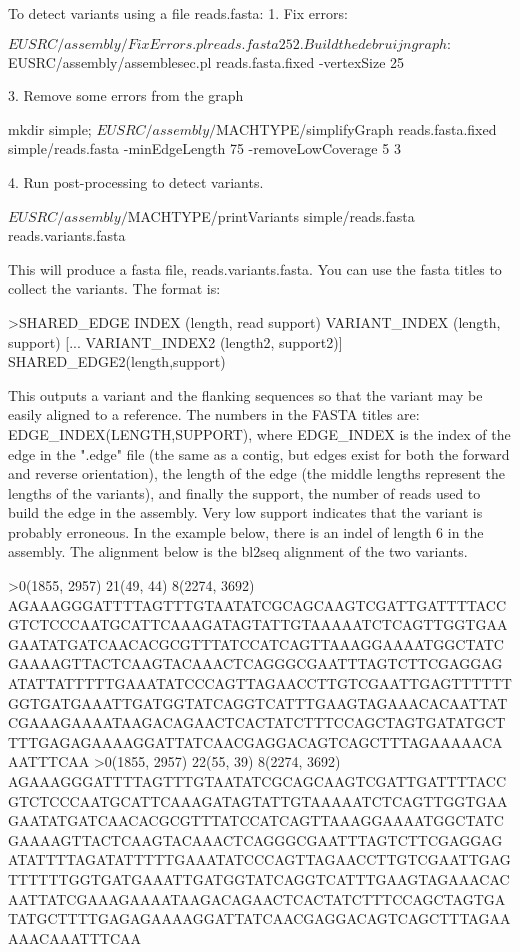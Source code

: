 \documentclass{article}[12pt]
\begin{document}
	To detect variants using a file reads.fasta:
	1. Fix errors:
	
	${EUSRC}/assembly/FixErrors.pl reads.fasta 25

	2. Build the de bruijn graph:
	
	${EUSRC}/assembly/assemblesec.pl reads.fasta.fixed -vertexSize 25
	
	3. Remove some errors from the graph

	mkdir simple;
	${EUSRC}/assembly/${MACHTYPE}/simplifyGraph reads.fasta.fixed
	simple/reads.fasta -minEdgeLength 75 -removeLowCoverage 5 3

	4. Run post-processing to detect variants.

	${EUSRC}/assembly/${MACHTYPE}/printVariants simple/reads.fasta
	reads.variants.fasta

	This will produce a fasta file, reads.variants.fasta.  You can use
	the fasta titles to collect the variants.  The format is:

	>SHARED\_EDGE INDEX (length, read support) VARIANT\_INDEX (length,
   support) [... VARIANT\_INDEX2 (length2, support2)] SHARED\_EDGE2(length,support)
	
This outputs a variant and the flanking sequences so that the variant
may be easily aligned to a reference.  The numbers in the FASTA titles
are: EDGE\_INDEX(LENGTH,SUPPORT), where EDGE\_INDEX is the index of the
edge in the ".edge" file (the same as a contig, but edges exist for
both the forward and reverse orientation), the length of the edge (the
middle lengths represent the lengths of the variants), and finally the
support, the number of reads used to build the edge in the assembly.
Very low support indicates that the variant is probably erroneous.  In
the example below, there is an indel of length 6 in the assembly.  The
alignment below is the bl2seq alignment of the two variants.


>0(1855, 2957) 21(49, 44) 8(2274, 3692) 
AGAAAGGGATTTTAGTTTGTAATATCGCAGCAAGTCGATTGATTTTACCGTCTCCCAATGCATTCAAAGATAGTATTGTAAAAATCTCAGTTGGTGAAGAATATGATCAACACGCGTTTATCCATCAGTTAAAGGAAAATGGCTATCGAAAAGTTACTCAAGTACAAACTCAGGGCGAATTTAGTCTTCGAGGAGATATTATTTTTGAAATATCCCAGTTAGAACCTTGTCGAATTGAGTTTTTTGGTGATGAAATTGATGGTATCAGGTCATTTGAAGTAGAAACACAATTATCGAAAGAAAATAAGACAGAACTCACTATCTTTCCAGCTAGTGATATGCTTTTGAGAGAAAAGGATTATCAACGAGGACAGTCAGCTTTAGAAAAACAAATTTCAA
>0(1855, 2957) 22(55, 39) 8(2274, 3692) 
AGAAAGGGATTTTAGTTTGTAATATCGCAGCAAGTCGATTGATTTTACCGTCTCCCAATGCATTCAAAGATAGTATTGTAAAAATCTCAGTTGGTGAAGAATATGATCAACACGCGTTTATCCATCAGTTAAAGGAAAATGGCTATCGAAAAGTTACTCAAGTACAAACTCAGGGCGAATTTAGTCTTCGAGGAGATATTTTAGATATTTTTGAAATATCCCAGTTAGAACCTTGTCGAATTGAGTTTTTTGGTGATGAAATTGATGGTATCAGGTCATTTGAAGTAGAAACACAATTATCGAAAGAAAATAAGACAGAACTCACTATCTTTCCAGCTAGTGATATGCTTTTGAGAGAAAAGGATTATCAACGAGGACAGTCAGCTTTAGAAAAACAAATTTCAA
\end{document}

